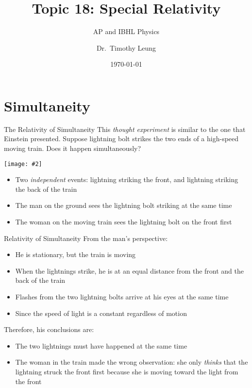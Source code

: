 \documentclass[12pt,compress,aspectratio=169]{beamer}
\title{Topic 18: Special Relativity}
\subtitle{AP and IBHL Physics}
\author[TML]{Dr.\ Timothy Leung}
\institute{Olympiads School}
\date{\today}
\newcommand{\pic}[2]{\texttt{[image: \#2]}}
\begin{document}
\begin{frame}
  \maketitle
\end{frame}



\section{Simultaneity}

\begin{frame}{The Relativity of Simultaneity}
  This \emph{thought experiment} is similar to the one that Einstein presented.
  Suppose lightning bolt strikes the two ends of a high-speed moving train.
  Does it happen simultaneously?
  \begin{center}
    \pic{.4}{graphics/87-1-1024x673.png}
  \end{center}

  \begin{itemize}
  \item\vspace{-.15in} Two \emph{independent} events: lightning striking the
    front, and lightning striking the back of the train
  \item The man on the ground sees the lightning bolt striking at the same time
  \item The woman on the moving train sees the lightning bolt on the front first
  \end{itemize}
\end{frame}



\begin{frame}{Relativity of Simultaneity}
  From the man's perspective:
  \begin{itemize}
  \item He is stationary, but the train is moving
  \item When the lightnings strike, he is at an equal distance from the front
    and the back of the train
  \item Flashes from the two lightning bolts arrive at his eyes at the same time
  \item Since the speed of light is a constant regardless of motion
  \end{itemize}
  Therefore, his conclusions are:
  \begin{itemize}
  \item The two lightnings must have happened at the same time
  \item The woman in the train made the wrong observation: she only
    \emph{thinks} that the lightning struck the front first because she is
    moving toward the light from the front
  \end{itemize}
\end{frame}
\end{document}
